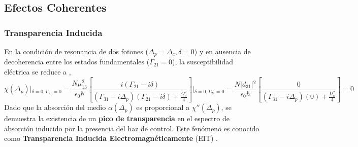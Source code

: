 \subsection{Efectos Coherentes}
\subsubsection*{Transparencia Inducida}
En la condición de resonancia de dos fotones ($\Delta_p = \Delta_c, \delta = 0$) y en ausencia de decoherencia entre los estados fundamentales ($\Gamma_{21}= 0$), la susceptibilidad eléctrica se reduce a \cite{harrisNonlinearOpticalProcesses1990,xiaoMeasurementDispersiveProperties1995}, 
\begin{equation}
\chi(\Delta_p)\Big\vert{}_{\delta=0, \Gamma_{21}=0} = \frac{N \mu_{13}^2}{\epsilon_0 \hbar} \left[ \frac{i (\Gamma_{21} - i\delta)}{(\Gamma_{31} - i\Delta_p)(\Gamma_{21} - i\delta) + \frac{\Omega_c^2}{4}}\right] \Big\vert{}_{\delta=0, \Gamma_{21}=0} =\frac{N \vert{}d_{31}\vert{}^2}{\epsilon_0 \hbar} \left[ \frac{0}{(\Gamma_{31}- i\Delta_p)(0) + \frac{\Omega_c^2}{4}} \right] = 0
\end{equation}
Dado que la absorción del medio $\alpha(\Delta_p)$ es proporcional a $\chi''(\Delta_p)$, se demuestra la existencia de un \textbf{pico de transparencia} en el espectro de absorción inducido por la presencia del haz de control. Este fenómeno es conocido como \textbf{Transparencia Inducida Electromagnéticamente} (EIT) \cite{bollerObservationElectromagneticallyInduced1991, ElectromagneticallyInducedTransparency1997}.
